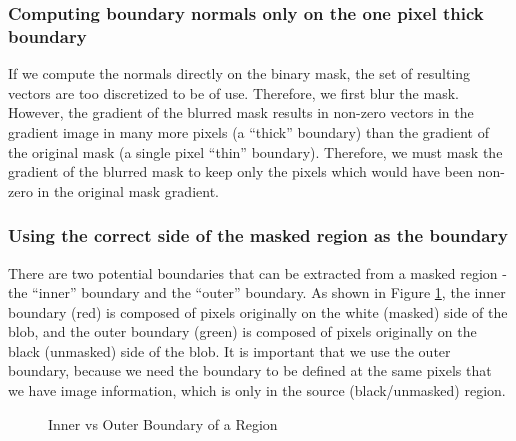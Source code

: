 \documentclass{InsightArticle}
\begin{document}
\subsubsection{Computing boundary normals only on the one pixel thick boundary}
If we compute the normals directly on the binary mask, the set of resulting vectors are too discretized to be of use. Therefore, we first blur the mask. However, the gradient of the blurred mask results in non-zero vectors in the gradient image in many more pixels (a ``thick'' boundary) than the gradient of the original mask (a single pixel ``thin'' boundary). Therefore, we must mask the gradient of the blurred mask to keep only the pixels which would have been non-zero in the original mask gradient.


\subsubsection{Using the correct side of the masked region as the boundary}
There are two potential boundaries that can be extracted from a masked region - the ``inner'' boundary and the ``outer'' boundary. As shown in Figure \ref{fig:BoundarySide}, the inner boundary (red) is composed of pixels originally on the white (masked) side of the blob, and the outer boundary (green) is composed of pixels originally on the black (unmasked) side of the blob. It is important that we use the outer boundary, because we need the boundary to be defined at the same pixels that we have image information, which is only in the source (black/unmasked) region.

\begin{figure}[H]
\centering
{}
\caption{Inner vs Outer Boundary of a Region}
\label{fig:BoundarySide}
\end{figure}
\end{document}
